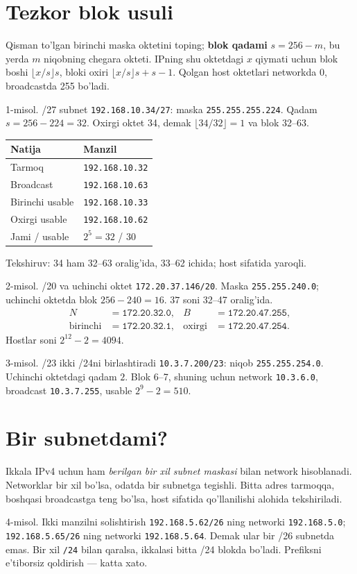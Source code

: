 \documentclass[11pt,a4paper,oneside]{book}
\newcommand{\kw}[1]{\textbf{\color{Deep}#1}}
\newcommand{\ip}[1]{\texttt{#1}}
\begin{document}
\section{Tezkor blok usuli}
Qisman to'lgan birinchi maska oktetini toping; \kw{blok qadami} $s=256-m$, bu yerda $m$ niqobning chegara okteti. IPning shu oktetdagi $x$ qiymati uchun blok boshi $\lfloor x/s\rfloor s$, bloki oxiri $\lfloor x/s\rfloor s+s-1$. Qolgan host oktetlari networkda 0, broadcastda 255 bo'ladi.
\begin{worked}{1-misol. /27 subnet}
\ip{192.168.10.34/27}: maska \ip{255.255.255.224}. Qadam $s=256-224=32$. Oxirgi oktet 34, demak $\lfloor34/32\rfloor=1$ va blok 32--63.
\par\medskip
\par\medskip
\begin{tabularx}{\textwidth}{p{}Y}\toprule
Natija & Manzil\\\midrule
Tarmoq & \ip{192.168.10.32}\\
Broadcast & \ip{192.168.10.63}\\
Birinchi usable & \ip{192.168.10.33}\\
Oxirgi usable & \ip{192.168.10.62}\\
Jami / usable & $2^5=32$ / $30$\\\bottomrule\end{tabularx}
Tekshiruv: 34 ham 32--63 oralig'ida, 33--62 ichida; host sifatida yaroqli.
\end{worked}
\begin{worked}{2-misol. /20 va uchinchi oktet}
\ip{172.20.37.146/20}. Maska \ip{255.255.240.0}; uchinchi oktetda blok $256-240=16$. $37$ soni 32--47 oralig'ida.
\begin{align*}
N&=\ip{172.20.32.0},& B&=\ip{172.20.47.255},\\
\text{birinchi}&=\ip{172.20.32.1},&\text{oxirgi}&=\ip{172.20.47.254}.
\end{align*}
Hostlar soni $2^{12}-2=4094$.
\end{worked}
\begin{worked}{3-misol. /23 ikki /24ni birlashtiradi}
\ip{10.3.7.200/23}: niqob \ip{255.255.254.0}. Uchinchi oktetdagi qadam $2$. Blok 6--7, shuning uchun network \ip{10.3.6.0}, broadcast \ip{10.3.7.255}, usable $2^9-2=510$.
\end{worked}
\section{Bir subnetdami?}
Ikkala IPv4 uchun ham \emph{berilgan bir xil subnet maskasi} bilan network hisoblanadi. Networklar bir xil bo'lsa, odatda bir subnetga tegishli. Bitta adres tarmoqqa, boshqasi broadcastga teng bo'lsa, host sifatida qo'llanilishi alohida tekshiriladi.
\begin{worked}{4-misol. Ikki manzilni solishtirish}
\ip{192.168.5.62/26} ning networki \ip{192.168.5.0}; \ip{192.168.5.65/26} ning networki \ip{192.168.5.64}. Demak ular bir /26 subnetda emas. Bir xil \ip{/24} bilan qaralsa, ikkalasi bitta /24 blokda bo'ladi. Prefiksni e'tiborsiz qoldirish — katta xato.
\end{worked}
\end{document}
